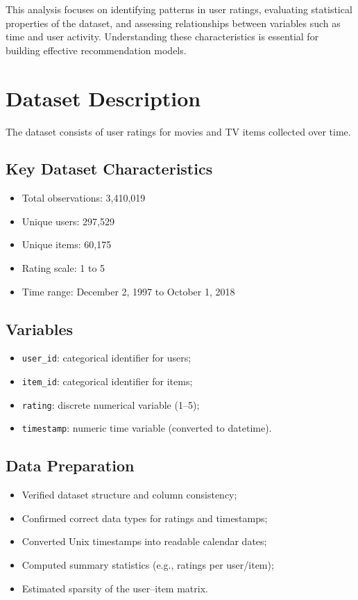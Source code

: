 \documentclass[conference]{IEEEtran}
\begin{document}
This analysis focuses on identifying patterns in user ratings, evaluating statistical properties of the dataset, and assessing relationships between variables such as time and user activity. Understanding these characteristics is essential for building effective recommendation models.

\section{Dataset Description}

The dataset consists of user ratings for movies and TV items collected over time.

\subsection{Key Dataset Characteristics}

\begin{itemize}
    \item Total observations: 3{,}410{,}019
    \item Unique users: 297{,}529
    \item Unique items: 60{,}175
    \item Rating scale: 1 to 5
    \item Time range: December 2, 1997 to October 1, 2018
\end{itemize}

\subsection{Variables}

\begin{itemize}
    \item \texttt{user\_id}: categorical identifier for users;
    \item \texttt{item\_id}: categorical identifier for items;
    \item \texttt{rating}: discrete numerical variable (1--5);
    \item \texttt{timestamp}: numeric time variable (converted to datetime).
\end{itemize}

\subsection{Data Preparation}

\begin{itemize}
    \item Verified dataset structure and column consistency;
    \item Confirmed correct data types for ratings and timestamps;
    \item Converted Unix timestamps into readable calendar dates;
    \item Computed summary statistics (e.g., ratings per user/item);
    \item Estimated sparsity of the user--item matrix.
\end{itemize}
\end{document}
